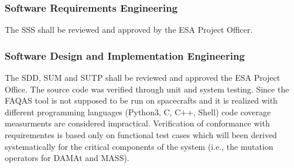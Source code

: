 
\subsubsection{Software Requirements Engineering}
The SSS shall be reviewed and approved by the ESA Project Officer.

\subsubsection{Software Design and Implementation Engineering}
The SDD, SUM and SUTP shall be reviewed and approved the ESA Project Office.
The source code was verified through unit and system testing.
Since the FAQAS tool is not supposed to be run on spacecrafts and it is realized with different programming languages (Python3, C, C++, Shell) code coverage measurments are considered impractical.
Verification of conformance with requirementes is based only on functional test cases which will been derived systematically for the critical components of the system (i.e., the mutation operators for DAMAt and MASS).


